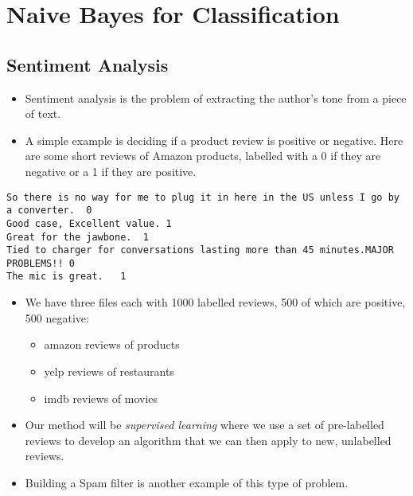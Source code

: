 \documentclass[
]{article}
\author{}
\date{}
\providecommand{\tightlist}{%
  \setlength{\itemsep}{0pt}\setlength{\parskip}{0pt}}
\begin{document}

\hypertarget{naive-bayes-for-classification}{%
\section{Naive Bayes for
Classification}\label{naive-bayes-for-classification}}

\hypertarget{sentiment-analysis}{%
\subsection{Sentiment Analysis}\label{sentiment-analysis}}

\begin{itemize}
\item
  Sentiment analysis is the problem of extracting the author's tone from
  a piece of text.
\item
  A simple example is deciding if a product review is positive or
  negative. Here are some short reviews of Amazon products, labelled
  with a 0 if they are negative or a 1 if they are positive.
\end{itemize}

\begin{lstlisting}
So there is no way for me to plug it in here in the US unless I go by a converter.  0
Good case, Excellent value. 1
Great for the jawbone.  1
Tied to charger for conversations lasting more than 45 minutes.MAJOR PROBLEMS!! 0
The mic is great.   1
\end{lstlisting}

\begin{itemize}
\item
  We have three files each with 1000 labelled reviews, 500 of which are
  positive, 500 negative:

  \begin{itemize}
  \tightlist
  \item
    amazon reviews of products
  \item
    yelp reviews of restaurants
  \item
    imdb reviews of movies
  \end{itemize}
\item
  Our method will be \emph{supervised learning} where we use a set of
  pre-labelled reviews to develop an algorithm that we can then apply to
  new, unlabelled reviews.
\item
  Building a Spam filter is another example of this type of problem.
\end{itemize}
\end{document}
